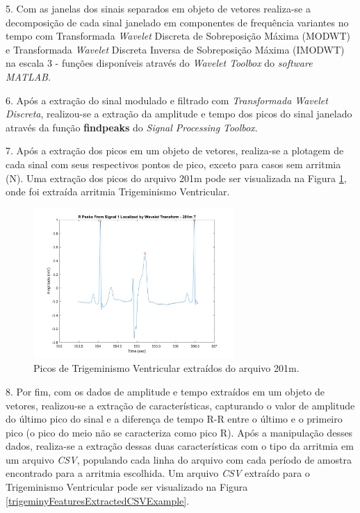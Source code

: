 \documentclass[conference]{IEEEtran}
\begin{document}
5. Com as janelas dos sinais separados em objeto de vetores realiza-se a decomposição de cada sinal janelado em componentes de frequência variantes no tempo com Transformada \textit{Wavelet} Discreta de Sobreposição Máxima (MODWT) e Transformada \textit{Wavelet} Discreta Inversa de Sobreposição Máxima (IMODWT) na escala 3 - funções disponíveis através do \textit{Wavelet Toolbox} do \textit{software MATLAB}.

6. Após a extração do sinal modulado e filtrado com \textit{Transformada Wavelet Discreta}, realizou-se a extração da amplitude e tempo dos picos do sinal janelado através da função \textbf{findpeaks} do \textit{Signal Processing Toolbox}.

7. Após a extração dos picos em um objeto de vetores, realiza-se a plotagem de cada sinal com seus respectivos pontos de pico, exceto para casos sem arritmia (N). Uma extração dos picos do arquivo 201m pode ser visualizada na Figura \ref{signalPeaksExtractedTrigeminy}, onde foi extraída arritmia Trigeminismo Ventricular.

\begin{figure}[!h]
	\centering
	\includegraphics[width=3in]{img/signalPeaksExtractedTrigeminy}
	\caption{Picos de Trigeminismo Ventricular extraídos do arquivo 201m.}
	\label{signalPeaksExtractedTrigeminy}
\end{figure}

8. Por fim, com os dados de amplitude e tempo extraídos em um objeto de vetores, realizou-se a extração de características, capturando o valor de amplitude do último pico do sinal e a diferença de tempo R-R entre o último e o primeiro pico (o pico do meio não se caracteriza como pico R). Após a manipulação desses dados, realiza-se a extração dessas duas características com o tipo da arritmia em um arquivo \textit{CSV}, populando cada linha do arquivo com cada período de amostra encontrado para a arritmia escolhida. Um arquivo \textit{CSV} extraído para o Trigeminismo Ventricular pode ser visualizado na Figura \ref{trigeminyFeaturesExtractedCSVExample}.
\end{document}
